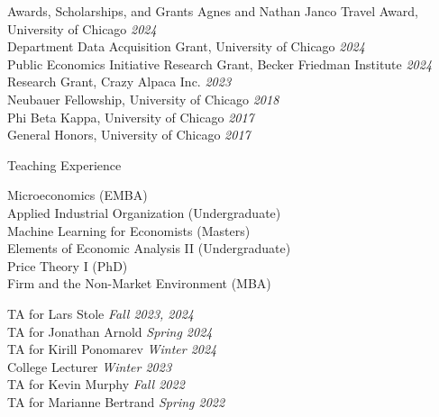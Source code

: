\documentclass{resume} %
\begin{document}
	\begin{rSection}{Awards, Scholarships, and Grants}
		Agnes and Nathan Janco Travel Award, University of Chicago \hfill {\em 2024} \\
		Department Data Acquisition Grant, University of Chicago \hfill {\em 2024} \\
		Public Economics Initiative Research Grant, Becker Friedman Institute \hfill {\em 2024} \\
		Research Grant, Crazy Alpaca Inc. \hfill {\em 2023} \\
		Neubauer Fellowship, University of Chicago \hfill {\em 2018} \\
		Phi Beta Kappa, University of Chicago \hfill {\em 2017} \\
		General Honors, University of Chicago \hfill {\em 2017}
	\end{rSection}

	\begin{rSection}{Teaching Experience}
		\begin{minipage}[t]{0.54\textwidth}
			Microeconomics (EMBA) \\
			Applied Industrial Organization (Undergraduate) \\
			Machine Learning for Economists (Masters) \\
			Elements of Economic Analysis II (Undergraduate) \\
			Price Theory I (PhD) \\
			Firm and the Non-Market Environment (MBA)
		\end{minipage}
		\begin{minipage}[t]{0.42\textwidth}
			TA for Lars Stole \hfill {\em Fall 2023, 2024} \\
			TA for Jonathan Arnold \hfill {\em Spring 2024} \\
			TA for Kirill Ponomarev \hfill {\em Winter 2024} \\
			College Lecturer \hfill {\em Winter 2023} \\
			TA for Kevin Murphy \hfill {\em Fall 2022} \\
			TA for Marianne Bertrand \hfill {\em Spring 2022}
		\end{minipage}
	\end{rSection}
\end{document}

